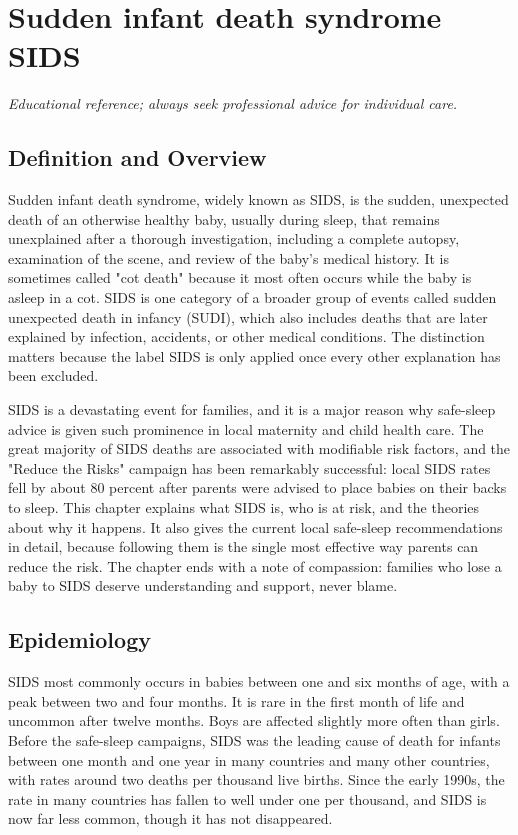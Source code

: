 \chapter{Sudden infant death syndrome SIDS}

\medskip
\noindent\textit{Educational reference; always seek professional advice for individual care.}

\section*{Definition and Overview}
Sudden infant death syndrome, widely known as SIDS, is the sudden, unexpected death of an otherwise healthy baby, usually during sleep, that remains unexplained after a thorough investigation, including a complete autopsy, examination of the scene, and review of the baby's medical history. It is sometimes called "cot death" because it most often occurs while the baby is asleep in a cot. SIDS is one category of a broader group of events called sudden unexpected death in infancy (SUDI), which also includes deaths that are later explained by infection, accidents, or other medical conditions. The distinction matters because the label SIDS is only applied once every other explanation has been excluded.

SIDS is a devastating event for families, and it is a major reason why safe-sleep advice is given such prominence in local maternity and child health care. The great majority of SIDS deaths are associated with modifiable risk factors, and the "Reduce the Risks" campaign has been remarkably successful: local SIDS rates fell by about 80 percent after parents were advised to place babies on their backs to sleep. This chapter explains what SIDS is, who is at risk, and the theories about why it happens. It also gives the current local safe-sleep recommendations in detail, because following them is the single most effective way parents can reduce the risk. The chapter ends with a note of compassion: families who lose a baby to SIDS deserve understanding and support, never blame.

\section*{Epidemiology}
SIDS most commonly occurs in babies between one and six months of age, with a peak between two and four months. It is rare in the first month of life and uncommon after twelve months. Boys are affected slightly more often than girls. Before the safe-sleep campaigns, SIDS was the leading cause of death for infants between one month and one year in many countries and many other countries, with rates around two deaths per thousand live births. Since the early 1990s, the rate in many countries has fallen to well under one per thousand, and SIDS is now far less common, though it has not disappeared.

